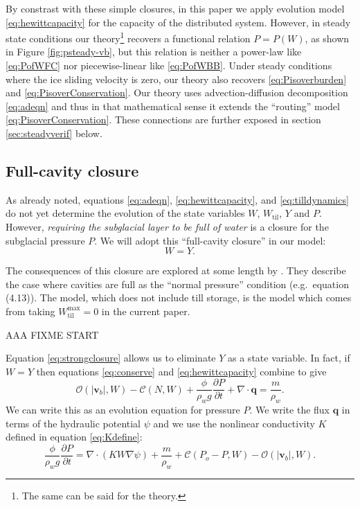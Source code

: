 \documentclass[11pt,final]{amsart}
\newcommand\bv{\mathbf{v}}
\newcommand\bq{\mathbf{q}}
\newcommand{\Div}{\nabla\cdot}
\newcommand{\grad}{\nabla}
\newcommand{\Wtil}{W_{\text{til}}}
\newcommand{\Wtilmax}{W_{\text{til}}^{\text{max}}}
\begin{document}
\medskip
By constrast with these simple closures, in this paper we apply evolution model \eqref{eq:hewittcapacity} for the capacity of the distributed system.  However, in steady state conditions our theory\footnote{The same can be said for the \cite{Schoofetal2012} theory.} recovers a functional relation $P=P(W)$, as shown in Figure \ref{fig:psteady-vb}, but this relation is neither a power-law like \eqref{eq:PofWFC} nor piecewise-linear like \eqref{eq:PofWBB}.  Under steady conditions where the ice sliding velocity is zero, our theory also recovers \eqref{eq:Pisoverburden} and \eqref{eq:PisoverConservation}.  Our theory uses advection-diffusion decomposition \eqref{eq:adeqn} and thus in that mathematical sense it extends the ``routing'' model \eqref{eq:PisoverConservation}.  These connections are further exposed in section \ref{sec:steadyverif} below.


\subsection*{Full-cavity closure}  As already noted, equations  \eqref{eq:adeqn}, \eqref{eq:hewittcapacity}, and \eqref{eq:tilldynamics} do not yet determine the evolution of the state variables $W$, $\Wtil$, $Y$ and $P$.  However, \emph{requiring the subglacial layer to be full of water} is a closure for the subglacial pressure $P$.  We will adopt this ``full-cavity closure'' in our model:
\begin{equation}
W = Y.\label{eq:strongclosure}
\end{equation}

The consequences of this closure are explored at some length by \cite{Schoofetal2012}.  They describe the case where cavities are full as the ``normal pressure'' condition (e.g.~equation (4.13)).  The \cite{Schoofetal2012} model, which does not include till storage, is the model which comes from taking $\Wtilmax=0$ in the current paper.

AAA FIXME START

Equation \eqref{eq:strongclosure} allows us to eliminate $Y$ as a state variable.  In fact, if $W=Y$ then equations \eqref{eq:conserve} and \eqref{eq:hewittcapacity} combine to give
\begin{equation}
\mathcal{O}(|\bv_b|,W) - \mathcal{C}(N,W) + \frac{\phi}{\rho_w g}\frac{\partial P}{\partial t} + \Div \bq = \frac{m}{\rho_w}. \label{eq:initialformpressure}
\end{equation}
We can write this as an evolution equation for pressure $P$.  We write the flux $\bq$ in terms of the hydraulic potential $\psi$ and we use the nonlinear conductivity $K$ defined in equation \eqref{eq:Kdefine}:
\begin{equation}
\frac{\phi}{\rho_w g}\frac{\partial P}{\partial t} = \Div\left(K W \grad \psi\right) + \frac{m}{\rho_w} + \mathcal{C}(P_o-P,W) - \mathcal{O}(|\bv_b|,W). \label{eq:pressureequation}
\end{equation}
\end{document}
